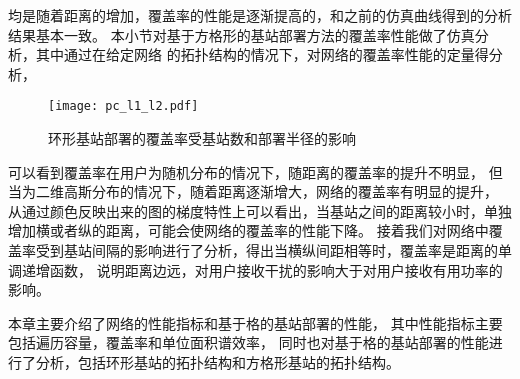 均是随着距离的增加，覆盖率的性能是逐渐提高的，和之前的仿真曲线得到的分析结果基本一致。
本小节对基于方格形的基站部署方法的覆盖率性能做了仿真分析，其中通过在给定网络
的拓扑结构的情况下，对网络的覆盖率性能的定量得分析，
\begin{figure}[htbp]
\centering
\texttt{[image: pc\_l1\_l2.pdf]}
\caption{环形基站部署的覆盖率受基站数和部署半径的影响}\vspace{-0.5em}
\label{pc_l1_l2}
\end{figure}
可以看到覆盖率在用户为随机分布的情况下，随距离的覆盖率的提升不明显，
但当为二维高斯分布的情况下，随着距离逐渐增大，网络的覆盖率有明显的提升，
从通过颜色反映出来的图的梯度特性上可以看出，当基站之间的距离较小时，单独增加横或者纵的距离，可能会使网络的覆盖率的性能下降。
接着我们对网络中覆盖率受到基站间隔的影响进行了分析，得出当横纵间距相等时，覆盖率是距离的单调递增函数，
说明距离边远，对用户接收干扰的影响大于对用户接收有用功率的影响。

本章主要介绍了网络的性能指标和基于格的基站部署的性能，
其中性能指标主要包括遍历容量，覆盖率和单位面积谱效率，
同时也对基于格的基站部署的性能进行了分析，包括环形基站的拓扑结构和方格形基站的拓扑结构。
